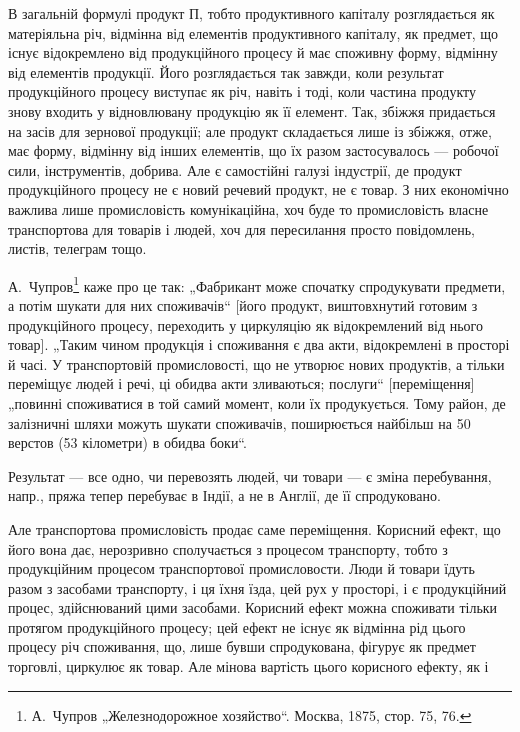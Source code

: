 В загальній формулі продукт П, тобто продуктивного капіталу розглядається
як матеріяльна річ, відмінна від елементів продуктивного капіталу, як
предмет, що існує відокремлено від продукційного процесу й має споживну
форму, відмінну від елементів продукції. Його розглядається так завжди, коли
результат продукційного процесу виступає як річ, навіть і тоді, коли частина
продукту знову входить у відновлювану продукцію як її елемент. Так,
збіжжя придається на засів для зернової продукції; але продукт складається
лише із збіжжя, отже, має форму, відмінну від інших елементів, що
їх разом застосувалось — робочої сили, інструментів, добрива. Але є
самостійні галузі індустрії, де продукт продукційного процесу не є
новий речевий продукт, не є товар. З них економічно важлива лише
промисловість комунікаційна, хоч буде то промисловість власне транспортова
для товарів і людей, хоч для пересилання просто повідомлень,
листів, телеграм тощо.

А.~Чупров\footnote{
А.~Чупров „Железнодорожное хозяйство“. Москва, 1875, стор. 75, 76.
} каже про це так: „Фабрикант може спочатку спродукувати
предмети, а потім шукати для них споживачів“ [його продукт, виштовхнутий
готовим з продукційного процесу, переходить у циркуляцію як
відокремлений від нього товар]. „Таким чином продукція і споживання є
два акти, відокремлені в просторі й часі. У транспортовій промисловості,
що не утворює нових продуктів, а тільки переміщує людей і речі, ці
обидва акти зливаються; послуги“ [переміщення] „повинні споживатися в
той самий момент, коли їх продукується. Тому район, де залізничні шляхи
можуть шукати споживачів, поширюється найбільш на 50 верстов
(53 кілометри) в обидва боки“.

Результат — все одно, чи перевозять людей, чи товари — є зміна перебування,
напр., пряжа тепер перебуває в Індії, а не в Англії, де її спродуковано.

Але транспортова промисловість продає саме переміщення. Корисний
ефект, що його вона дає, нерозривно сполучається з процесом транспорту,
тобто з продукційним процесом транспортової промисловости.
Люди й товари їдуть разом з засобами транспорту, і ця їхня їзда, цей
рух у просторі, і є продукційний процес, здійснюваний цими засобами. Корисний
ефект можна споживати тільки протягом продукційного процесу;
цей ефект не існує як відмінна рід цього процесу річ споживання,
що, лише бувши спродукована, фігурує як предмет торговлі,
циркулює як товар. Але мінова вартість цього корисного ефекту, як і
\parbreak{}  %

